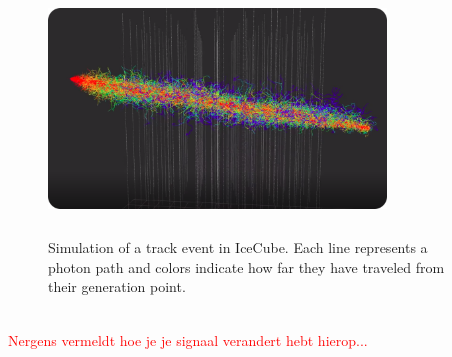 \begin{figure}
\centering
\includegraphics[width=0.8\textwidth,height=2.6in]{chapter6/img/photons_track_rounded.png}
\caption{Simulation of a track event in IceCube. Each line represents a photon path and colors indicate how far they have traveled from their generation point.}
\label{fig:photonsimulation}
\end{figure}

\textcolor{red}{\\Nergens vermeldt hoe je je signaal verandert hebt hierop...\\}

